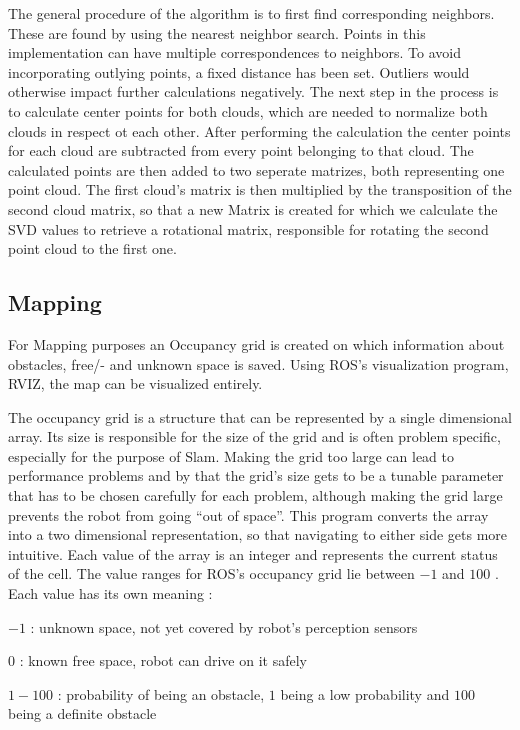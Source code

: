 \documentclass{ba-kecs}
\begin{document}
The general procedure of the algorithm is to first find corresponding neighbors. These are found by using the nearest neighbor search. Points in this implementation can have multiple correspondences to neighbors. To avoid incorporating outlying points, a fixed distance has been set. Outliers would otherwise impact further calculations negatively.
The next step in the process is to calculate center points for both clouds, which are needed to normalize both clouds in respect ot each other. After performing the calculation the center points for each cloud are subtracted from every point belonging to that cloud. The calculated points are then added to two seperate matrizes, both representing one point cloud. The first cloud's matrix is then multiplied by the transposition of the second cloud matrix, so that a new Matrix is created for which we calculate the SVD values to retrieve a rotational matrix, responsible for rotating the second point cloud to the first one.
\subsection{Mapping}\label{mapping}

For Mapping purposes an Occupancy grid is created on which information about obstacles, free/- and unknown space is saved. Using ROS's visualization program, RVIZ, the map can be visualized entirely.

The occupancy grid is a structure that can be represented by a single dimensional array. Its size is responsible for the size of the grid and is often problem specific, especially for the purpose of Slam. Making the grid too large can lead to performance problems and by that the grid's size gets to be a tunable parameter that has to be chosen carefully for each problem, although making the grid large prevents the robot from going ``out of space''.
 This program converts the array into a two dimensional representation, so that navigating to either side gets more intuitive. Each value of the array is an integer and represents the current status of the cell. The value ranges for ROS's occupancy grid lie between $-1$ and $100$ \cite{occupancy}. Each value has its own meaning :

\begin{description}
\item{$-1$} : unknown space, not yet covered by robot's perception sensors
\item{$ 0$} : known free space, robot can drive on it safely
\item{$1-100$} : probability of being an obstacle, $1$ being a low probability and $100$ being a definite obstacle
\end{description}
\end{document}
